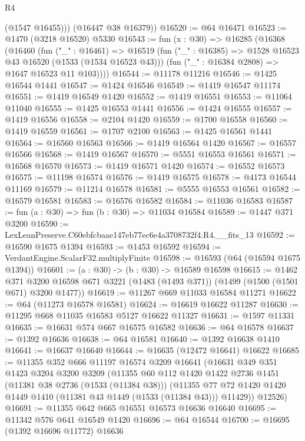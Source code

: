 \begin{lexlean}{R4}
\begin{coremodule}
          (@1547 @16455)))
      (@16447 @38 @16379))
@16520 := @64 @16471
@16523 := @1470 (@3218 @16520) @5330
@16543 := fun (x : @30) =>
  @16285
    (@16368
      (@16460
        (fun ("_" : @16461) =>
        @16519
          (fun ("_" : @16385) => @1528 @16523 @43 @16520 (@1533 (@1534 @16523 @43)))
          (fun ("_" : @16384 @2808) => @1647 @16523 @11 @103))))
@16544 := @11178 @11216
@16546 := @1425 @16544 @1441
@16547 := @1424 @16546
@16549 := @1419 @16547 @11174
@16551 := @1419 @16549 @1420
@16552 := @1419 @16551
@16553 := @11064 @11040
@16555 := @1425 @16553 @1441
@16556 := @1424 @16555
@16557 := @1419 @16556
@16558 := @2104 @1420
@16559 := @1700 @16558
@16560 := @1419 @16559
@16561 := @1707 @2100
@16563 := @1425 @16561 @1441
@16564 := @16560 @16563
@16566 := @1419 @16564 @1420
@16567 := @16557 @16566
@16568 := @1419 @16567
@16570 := @5551 @16553 @16561
@16571 := @16568 @16570
@16573 := @1419 @16571 @1420
@16574 := @16552 @16573
@16575 := @11198 @16574
@16576 := @1419 @16575
@16578 := @4173 @16544 @11169
@16579 := @11214 @16578
@16581 := @5555 @16553 @16561
@16582 := @16579 @16581
@16583 := @16576 @16582
@16584 := @11036 @16583
@16587 := fun (a : @30) => fun (b : @30) => @11034 @16584
@16589 := @1447 @371 @3200
@16590 := LexLeanPreserve.C60ebfcbaae147eb77ec6e4a3708732f4.R4.__fits_13
@16592 := @16590 @1675 @1394
@16593 := @1453 @16592
@16594 := VerdantEngine.ScalarF32.multiplyFinite
@16598 := @16593 (@64 (@16594 @1675 @1394))
@16601 := (a : @30) -> (b : @30) -> @16589 @16598
@16615 := @1462
    @371
    @3200
    @16598
    @671
    @3221
    (@1483 (@1493 @371))
    (@1499 (@1500 (@1501 @671) @3200 @1477))
@16619 := @11267 @669 @11033 @16584 @11271
@16622 := @64 (@11273 @16578 @16581)
@16624 := @16619 @16622 @11287
@16630 := @11295 @668 @11035 @16583 @5127 @16622 @11327
@16631 := @1597 @11331
@16635 := @16631 @574 @667 @16575 @16582
@16636 := @64 @16578
@16637 := @1392 @16636
@16638 := @64 @16581
@16640 := @1392 @16638 @1410
@16641 := @16637 @16640
@16644 := @16635 (@12472 @16641) @16622
@16685 := @11355
    @352
    @666
    @11197
    @16574
    @3209
    @16641
    (@16631
      @349
      @351
      @1423
      @3204
      @3200
      @3209
      (@11355
        @60
        @112
        @1420
        @1422
        @2736
        @1451
        (@11381 @38 @2736 (@1533 (@11384 @38)))
        (@11355 @77 @72 @1420 @1420 @1449 @1410 (@11381 @43 @1449 (@1533 (@11384 @43))) @11429))
      @12526)
@16691 := @11355 @642 @665 @16551 @16573 @16636 @16640
@16695 := @11342 @576 @641 @16549 @1420
@16696 := @64 @16544
@16700 := @16695 (@1392 @16696 @11772) @16636

\end{coremodule}
\end{lexlean}
